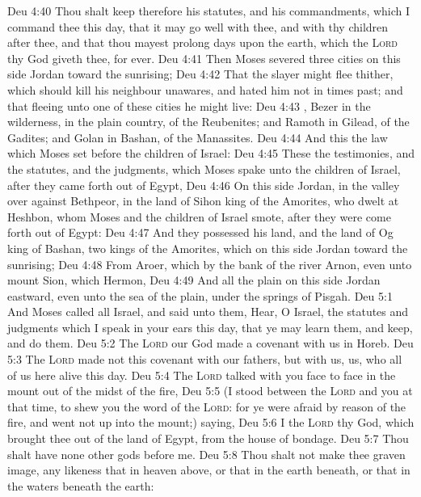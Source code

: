 \vs Deu 4:40 Thou shalt keep therefore his statutes, and his commandments, which I command thee this day, that it may go well with thee, and with thy children after thee, and that thou mayest prolong  days upon the earth, which the \textsc{Lord} thy God giveth thee, for ever.
\vs Deu 4:41 Then Moses severed three cities on this side Jordan toward the sunrising;
\vs Deu 4:42 That the slayer might flee thither, which should kill his neighbour unawares, and hated him not in times past; and that fleeing unto one of these cities he might live:
\vs Deu 4:43 , Bezer in the wilderness, in the plain country, of the Reubenites; and Ramoth in Gilead, of the Gadites; and Golan in Bashan, of the Manassites.
\vs Deu 4:44 And this  the law which Moses set before the children of Israel:
\vs Deu 4:45 These  the testimonies, and the statutes, and the judgments, which Moses spake unto the children of Israel, after they came forth out of Egypt,
\vs Deu 4:46 On this side Jordan, in the valley over against Bethpeor, in the land of Sihon king of the Amorites, who dwelt at Heshbon, whom Moses and the children of Israel smote, after they were come forth out of Egypt:
\vs Deu 4:47 And they possessed his land, and the land of Og king of Bashan, two kings of the Amorites, which  on this side Jordan toward the sunrising;
\vs Deu 4:48 From Aroer, which  by the bank of the river Arnon, even unto mount Sion, which  Hermon,
\vs Deu 4:49 And all the plain on this side Jordan eastward, even unto the sea of the plain, under the springs of Pisgah.
\vs Deu 5:1 And Moses called all Israel, and said unto them, Hear, O Israel, the statutes and judgments which I speak in your ears this day, that ye may learn them, and keep, and do them.
\vs Deu 5:2 The \textsc{Lord} our God made a covenant with us in Horeb.
\vs Deu 5:3 The \textsc{Lord} made not this covenant with our fathers, but with us,  us, who  all of us here alive this day.
\vs Deu 5:4 The \textsc{Lord} talked with you face to face in the mount out of the midst of the fire,
\vs Deu 5:5 (I stood between the \textsc{Lord} and you at that time, to shew you the word of the \textsc{Lord}: for ye were afraid by reason of the fire, and went not up into the mount;) saying,
\vs Deu 5:6 I  the \textsc{Lord} thy God, which brought thee out of the land of Egypt, from the house of bondage.
\vs Deu 5:7 Thou shalt have none other gods before me.
\vs Deu 5:8 Thou shalt not make thee  graven image,  any likeness  that  in heaven above, or that  in the earth beneath, or that  in the waters beneath the earth:
